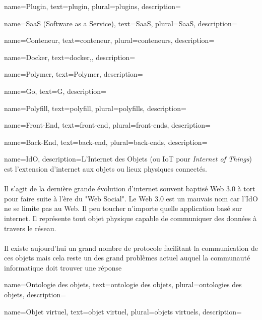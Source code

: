 \makeglossaries

{
    name=Plugin,
    text=plugin,
    plural=plugins,
    description={}
}

{
    name=SaaS (Software as a Service),
    text=SaaS,
    plural=SaaS,
    description={}
}

{
    name=Conteneur,
    text=conteneur,
    plural=conteneurs,
    description={}
}

{
    name=Docker,
    text=docker,,
    description={}
}

{
    name=Polymer,
    text=Polymer,
    description={}
}

{
    name=Go,
    text=G,
    description={}
}

{
    name=Polyfill,
    text=polyfill,
    plural=polyfills,
    description={}
}

{
    name=Front-End,
    text=front-end,
    plural=front-ends,
    description={}
}

{
    name=Back-End,
    text=back-end,
    plural=back-ends,
    description={}
}

{
    name=IdO,
    description={L'Internet des Objets (ou IoT pour \textit{Internet of Things}) est l'extension d'internet aux objets ou lieux physiques connectés.\\\\
    Il s'agit de la dernière grande évolution d'internet souvent baptisé Web 3.0 à tort pour faire suite à l'ère du "Web Social". Le Web 3.0 est un mauvais nom car l'IdO ne se limite pas au Web. Il peu toucher n'importe quelle application basé sur internet. Il représente tout objet physique capable de communiquer des données à travers le réseau. \\\\
    Il existe aujourd'hui un grand nombre de protocole facilitant la communication de ces objets mais cela reste un des grand problèmes actuel auquel la communauté informatique doit trouver une réponse}
}

{
    name=Ontologie des objets,
    text=ontologie des objets,
    plural=ontologies des objets,
    description={}
}

{
    name=Objet virtuel,
    text=objet virtuel,
    plural=objets virtuels,
    description={}
}

